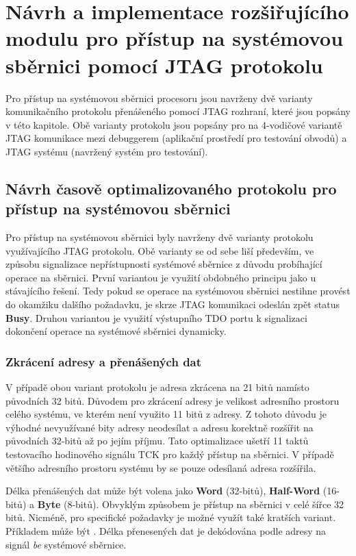 \chapter{Návrh a implementace rozšiřujícího modulu pro přístup na systémovou sběrnici pomocí JTAG protokolu}	\label{jtag_ap}
Pro přístup na systémovou sběrnici procesoru jsou navrženy dvě varianty komunikačního protokolu přenášeného pomocí JTAG rozhraní, které jsou popsány v této kapitole. Obě varianty protokolu jsou popsány pro na 4-vodičové variantě \acs{JTAG} komunikace mezi debuggerem (aplikační prostředí pro testování obvodů) a \acs{JTAG} systému (navržený systém pro testování).

\section{Návrh časově optimalizovaného protokolu pro přístup na systémovou sběrnici}	\label{sec:protokoly}
Pro přístup na systémovou sběrnici byly navrženy dvě varianty protokolu využívajícího JTAG protokolu. Obě varianty se od sebe liší především, ve způsobu signalizace nepřístupnosti systémové sběrnice z důvodu probíhající operace na sběrnici. První variantou je využití obdobného principu jako u stávajícího řešení. Tedy pokud se operace na systémovou sběrnici nestihne provést do okamžiku dalšího požadavku, je skrze JTAG komunikaci odeslán zpět status \textbf{Busy}. Druhou variantou je využití výstupního \acs{TDO} portu k signalizaci dokončení operace na systémové sběrnici dynamicky.

\subsection{Zkrácení adresy a přenášených dat}
V případě obou variant protokolu je adresa zkrácena na 21 bitů namísto původních 32 bitů. Důvodem pro zkrácení adresy je velikost adresního prostoru celého systému, ve kterém není využito 11 bitů z adresy. Z tohoto důvodu je výhodné nevyužívané bity adresy neodesílat a adresu korektně rozšířit na původních 32-bitů až po jejím příjmu. Tato optimalizace ušetří 11 taktů testovacího hodinového signálu \acs{TCK} pro každý přístup na sběrnici. V případě většího adresního prostoru systému by se pouze odesílaná adresa rozšířila.

Délka přenášených dat může být volena jako \textbf{Word} (32-bitů), \textbf{Half-Word} (16-bitů) a \textbf{Byte} (8-bitů). Obvyklým způsobem je přístup na sběrnici v celé šířce 32 bitů. Nicméně, pro specifické požadavky je možné využít také kratších variant. Příkladem může být    . Délka přenesených dat je dekódována podle adresy na signál \textit{be} systémové sběrnice.

